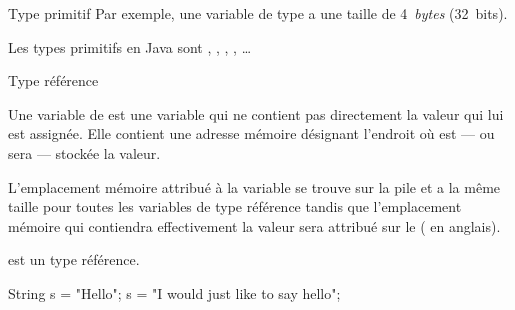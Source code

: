 \begin{hideedit}
\begin{frame}{Type primitif}
  \pause
  Par exemple, une variable de type  a une taille de
  4~\textit{bytes} (32~bits).

  \begin{center}
  \end{center}

  Les types primitifs en Java sont , 
  , , , \dots
\end{frame}

\begin{frame}{Type référence}
  \begin{definition}
  Une variable de  est une variable qui ne contient
  pas directement la valeur qui lui est assignée. Elle contient une adresse
  mémoire désignant l'endroit où est --- ou sera --- stockée la valeur.

  L'emplacement mémoire attribué à la variable se trouve sur la pile et
  a la même taille pour toutes les variables de type référence tandis
  que l'emplacement mémoire qui contiendra effectivement la valeur sera
  attribué sur le  ( en anglais).
  \end{definition}

\end{frame}

\begin{frame}[fragile]
   est un type référence.

  \begin{java}
String s = "Hello";
s = "I would just like to say hello";
  \end{java}

   {
  \hspace{3cm}
  }


\end{frame}
\end{hideedit}
